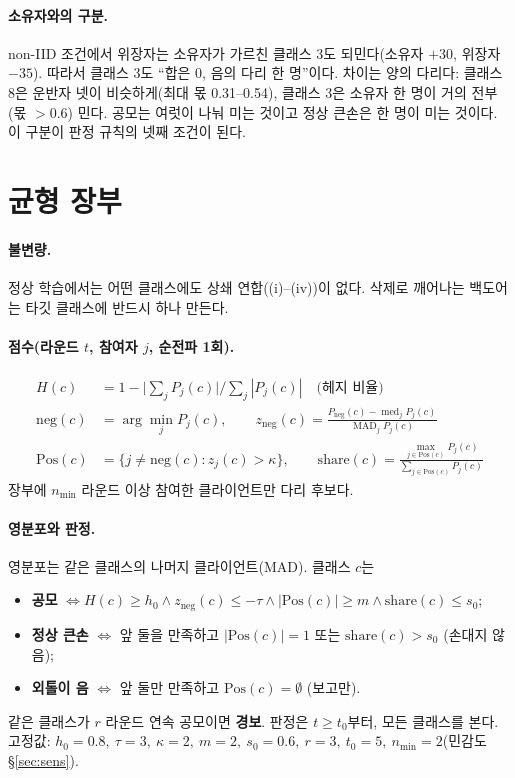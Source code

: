 \documentclass[10pt,a4paper]{article}
\begin{document}
\paragraph{소유자와의 구분.} non-IID 조건에서 위장자는 소유자가 가르친 클래스 3도 되민다(소유자 $+30$, 위장자 $-35$). 따라서 클래스 3도 ``합은 0, 음의 다리 한 명''이다. 차이는 양의 다리다: 클래스 8은 운반자 넷이 비슷하게(최대 몫 0.31--0.54), 클래스 3은 소유자 한 명이 거의 전부(몫 $>0.6$) 민다. 공모는 여럿이 나눠 미는 것이고 정상 큰손은 한 명이 미는 것이다. 이 구분이 판정 규칙의 넷째 조건이 된다.

\section{균형 장부}\label{sec:method}
\paragraph{불변량.} 정상 학습에서는 어떤 클래스에도 상쇄 연합((i)--(iv))이 없다. 삭제로 깨어나는 백도어는 타깃 클래스에 반드시 하나 만든다.
\paragraph{점수(라운드 $t$, 참여자 $j$, 순전파 1회).}
\begin{align}
H(c)&=1-\Big|\textstyle\sum_j P_j(c)\Big|\Big/\textstyle\sum_j|P_j(c)| \quad\text{(헤지 비율)}\\
\mathrm{neg}(c)&=\arg\min_j P_j(c),\qquad z_{\mathrm{neg}}(c)=\frac{P_{\mathrm{neg}}(c)-\operatorname{med}_jP_j(c)}{\operatorname{MAD}_jP_j(c)}\\
\mathrm{Pos}(c)&=\{j\neq\mathrm{neg}(c): z_j(c)>\kappa\},\qquad \mathrm{share}(c)=\frac{\max_{j\in\mathrm{Pos}(c)}P_j(c)}{\sum_{j\in\mathrm{Pos}(c)}P_j(c)}
\end{align}
장부에 $n_{\min}$ 라운드 이상 참여한 클라이언트만 다리 후보다.
\paragraph{영분포와 판정.} 영분포는 같은 클래스의 나머지 클라이언트(MAD). 클래스 $c$는
\begin{itemize}
\item \textbf{공모} $\Leftrightarrow H(c)\ge h_0 \wedge z_{\mathrm{neg}}(c)\le-\tau \wedge |\mathrm{Pos}(c)|\ge m \wedge \mathrm{share}(c)\le s_0$;
\item \textbf{정상 큰손} $\Leftrightarrow$ 앞 둘을 만족하고 $|\mathrm{Pos}(c)|=1$ 또는 $\mathrm{share}(c)>s_0$ (손대지 않음);
\item \textbf{외톨이 음} $\Leftrightarrow$ 앞 둘만 만족하고 $\mathrm{Pos}(c)=\emptyset$ (보고만).
\end{itemize}
같은 클래스가 $r$ 라운드 연속 공모이면 \textbf{경보}. 판정은 $t\ge t_0$부터, 모든 클래스를 본다. 고정값: $h_0=0.8,\ \tau=3,\ \kappa=2,\ m=2,\ s_0=0.6,\ r=3,\ t_0=5,\ n_{\min}=2$(민감도 \S\ref{sec:sens}).
\end{document}

